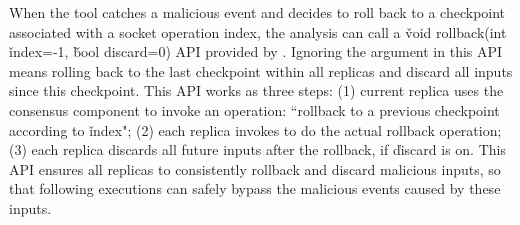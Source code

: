 When the tool catches a malicious event and decides to roll back to a 
checkpoint associated with a socket operation index, the analysis can call a 
\v{void rollback(int} \v{index=-1,} \v{bool discard=0)} API provided 
by \xxx. Ignoring the argument in this API means rolling back to the last 
checkpoint within all replicas and discard all inputs since this checkpoint. 
This API works as three steps: (1) current replica uses the \paxos consensus 
component to invoke an operation: ``rollback to a previous checkpoint according 
to \v{index}"; (2) each replica invokes \criu to do the actual rollback 
operation; (3) each replica discards all future inputs after the rollback, if 
\v{discard} is on. This API ensures all replicas to consistently rollback and 
discard malicious inputs, so that following executions can safely bypass the 
malicious events caused by these inputs.





